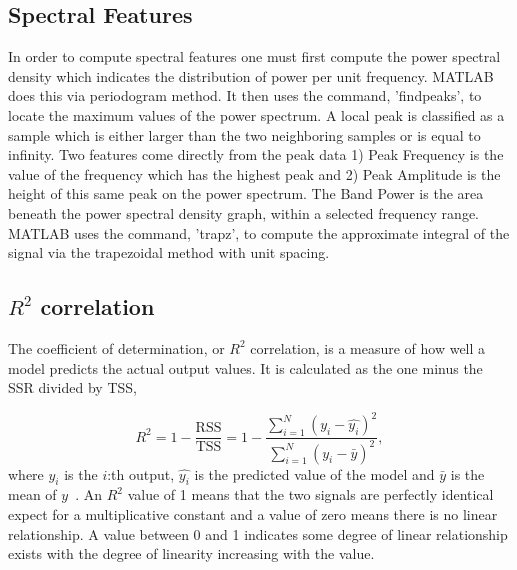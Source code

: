 \documentclass[]{article}
\begin{document}
\subsection{Spectral Features}
In order to compute spectral features one must first compute the power spectral density which indicates the distribution of power per unit frequency. MATLAB does this via periodogram method. It then uses the command, 'findpeaks', to locate the maximum values of the power spectrum. A local peak is classified as a sample which is either larger than the two neighboring samples or is equal to infinity. Two features come directly from the peak data 1)
Peak Frequency is the value of the frequency which has the highest peak and 2)
Peak Amplitude is the height of this same peak on the power spectrum.
The Band Power is the area beneath the power spectral density graph, within a selected frequency range. MATLAB uses the command, 'trapz', to compute the approximate integral of the signal via the trapezoidal method with unit spacing.

\subsection{$R^{2}$ correlation}
The coefficient of determination, or $R^{2}$ correlation, is a measure of how well a model predicts the actual output values. It is calculated as the one minus the \gls{SSR} divided by \gls{TSS},

\begin{equation}
R^{2} = 1 - \frac{\textrm{RSS}}{\textrm{TSS}} = 1-\frac{\sum^N_{i=1}(y_i - \hat{y_i})^2}{\sum^N_{i=1}(y_i - \bar{y})^2},
\end{equation}
where $y_i$ is the $i$:th output, $\hat{y_i}$ is the predicted value of the model and $\bar{y}$ is the mean of $y$~\cite{james2013introduction}. An $R^{2}$ value of 1 means that the two signals are perfectly identical expect for a multiplicative constant and a value of zero means there is no linear relationship. A value between 0 and 1 indicates some degree of linear relationship exists with the degree of linearity increasing with the value.
        
\end{document}
